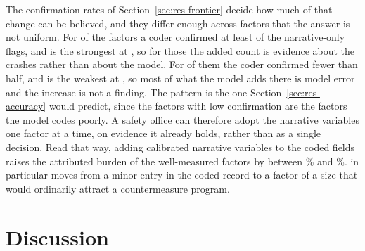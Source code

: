 The confirmation rates of Section~\ref{sec:res-frontier} decide how much of that change can be
believed, and they differ enough across factors that the answer is not uniform. For
\DownNConfirmHigh{} of the \DownNVars{} factors a coder confirmed at least
\DownConfirmHighThreshold{} of the narrative-only flags, and \DownConfirmHiVar{} is the
strongest at \DownConfirmHi{}, so for those the added count is evidence about the crashes rather
than about the model. For \DownNConfirmLow{} of them the coder confirmed fewer than half, and
\DownConfirmLoVar{} is the weakest at \DownConfirmLo{}, so most of what the model adds there is
model error and the increase is not a finding. The pattern is the one
Section~\ref{sec:res-accuracy} would predict, since the factors with low confirmation are the
factors the model codes poorly. A safety office can therefore adopt the narrative variables one
factor at a time, on evidence it already holds, rather than as a single decision. Read that
way, adding calibrated narrative variables to the coded fields raises the attributed burden of
the well-measured factors by between \DownRelMin\% and \DownRelMax\%. \DownRelMaxVar{} in
particular moves from a minor entry in the coded record to a factor of a size that would
ordinarily attract a countermeasure program.



\section{Discussion}
\label{sec:discussion}

